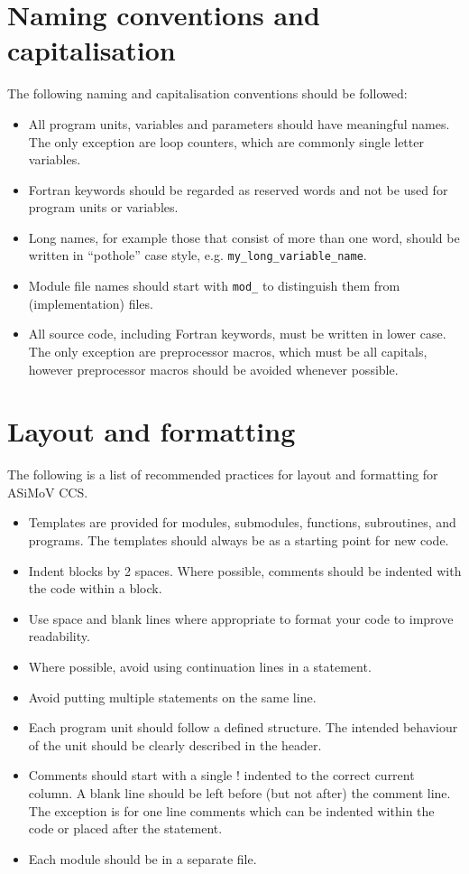 \documentclass[11pt]{article}
\begin{document}
\section{Naming conventions and capitalisation}
The following naming and capitalisation conventions should be followed:
\begin{itemize}
  \item All program units, variables and parameters should have meaningful names. The only exception are loop counters, which
  are commonly single letter variables.
  \item Fortran keywords should be regarded as reserved words and not be used for program units or variables.
  \item Long names, for example those that consist of more than one word, 
  should be written in ``pothole'' case style, e.g. \texttt{my\_long\_variable\_name}.
  \item Module file names should start with \texttt{mod\_} to distinguish them from (implementation) files.
  \item All source code, including Fortran keywords, must be written in lower case. The only exception are preprocessor 
  macros, which must be all capitals, however preprocessor macros should be avoided whenever possible.
\end{itemize}

\section{Layout and formatting}
The following is a list of recommended practices for layout and formatting for ASiMoV CCS.

\begin{itemize}
\item Templates are provided for modules, submodules, functions, subroutines, and programs. The templates should always be as a 
starting point for new code.
\item Indent blocks by 2 spaces. Where possible, comments should be indented with the code within a block.
\item Use space and blank lines where appropriate to format your code to improve readability.
\item Where possible, avoid using continuation lines in a statement.
\item Avoid putting multiple statements on the same line.
\item Each program unit should follow a defined structure. The intended behaviour of the unit should be clearly described in the header.
\item Comments should start with a single ! indented to the correct current column. A blank line should be left before (but not after) the 
comment line. The exception is for one line comments which can be indented within the code or placed after the statement.
\item Each module should be in a separate file.
\end{itemize}
\end{document}
